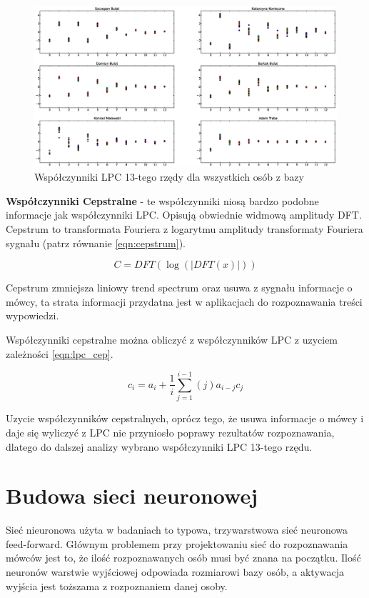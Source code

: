 \documentclass[a4paper]{article}
\begin{document}
\begin{figure}
    \includegraphics[width=\textwidth]{lpc_samochod}
    \caption{Współczynniki LPC 13-tego rzędy dla wszystkich osób z bazy}
    \label{fig:lpc}
\end{figure}

\textbf{Współczynniki Cepstralne} - te współczynniki niosą bardzo podobne
informacje jak współczynniki LPC. Opisują obwiednie widmową amplitudy DFT.
Cepstrum to transformata Fouriera z logarytmu amplitudy transformaty Fouriera
sygnału (patrz równanie \ref{eqn:cepstrum}).

\begin{equation}\label{eqn:cepstrum}
    C = DFT( \log ( | DFT (x) | ) )
\end{equation}

Cepstrum zmniejsza liniowy trend spectrum oraz usuwa z sygnału informacje o
mówcy, ta strata informacji przydatna jest w aplikacjach do rozpoznawania
treści wypowiedzi.

Współczynniki cepstralne można obliczyć z współczynników LPC z uzyciem
zależności \ref{eqn:lpc_cep}.

\begin{equation}\label{eqn:lpc_cep}
    c_i = a_i + \frac{1}{i} \sum_{j=1}^{i-1} (j)a_{i-j} c_j
\end{equation}

Uzycie współczynników cepstralnych, oprócz tego, że usuwa informacje o mówcy i
daje się wyliczyć z LPC nie przyniosło poprawy rezultatów rozpoznawania,
dlatego do dalszej analizy wybrano współczynniki LPC 13-tego rzędu.


\section{Budowa sieci neuronowej}

Sieć nieuronowa użyta w badaniach to typowa, trzywarstwowa sieć neuronowa
feed-forward. Głównym problemem przy projektowaniu sieć do rozpoznawania mówców
jest to, że ilość rozpoznawanych osób musi być znana na początku. Ilość
neuronów warstwie wyjściowej odpowiada rozmiarowi bazy osób, a aktywacja
wyjścia jest toższama z rozpoznaniem danej osoby.
\end{document}
